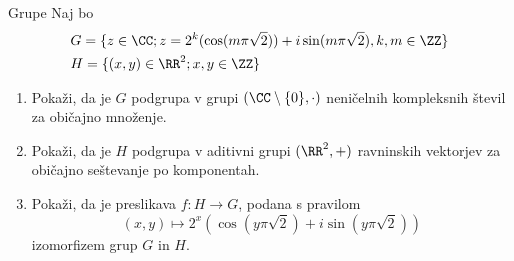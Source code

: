 \begin{frame}{Grupe}
	Naj bo \begin{align*}
	&G=\{z\in\CC;z=2^k(\cos(m\pi\sqrt{2}))+i\sin(m\pi\sqrt{2}),k,m\in\ZZ\}\\
	&H=\{(x,y)\in\RR^2;x,y\in\ZZ\}
	\end{align*}
	
	\begin{enumerate}
		\item
			Pokaži, da je $G$ podgrupa v grupi $(\CC\setminus\{0\},\cdot)$
			neničelnih kompleksnih števil za običajno množenje.
		\item
			Pokaži, da je $H$ podgrupa v aditivni grupi $(\RR^2,+)$
			ravninskih vektorjev za običajno seštevanje po komponentah.
		\item
			Pokaži, da je preslikava $f:H\to G$, podana s pravilom
			\[(x,y)\mapsto 2^x(\cos(y\pi\sqrt{2})+i\sin(y\pi\sqrt{2}))\]
			izomorfizem grup $G$ in $H$.
	\end{enumerate}
\end{frame}
